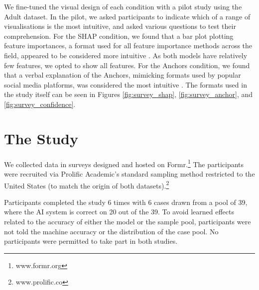 We fine-tuned the visual design of each condition with a pilot study using the Adult dataset. In the pilot, we asked participants to indicate which of a range of visualisations is the most intuitive, and asked various questions to test their comprehension. For the SHAP condition, we found that a bar plot plotting feature importances, a format used for all feature importance methods across the field, appeared to be considered more intuitive \cite{weerts_human-grounded_2019}. As both models have relatively few features, we opted to show all features. For the Anchors condition, we found that a verbal explanation of the Anchors, mimicking formats used by popular social media platforms, was considered the most intuitive \cite{ribeiro_anchors_2018}. The formats used in the study itself can be seen in Figures \ref{fig:survey_shap}, \ref{fig:survey_anchor}, and \ref{fig:survey_confidence}.

\section{The Study}\label{sec:study}
We collected data in surveys designed and hosted on Formr.\footnote{www.formr.org} The participants were recruited via Prolific Academic's standard sampling method restricted to the United States (to match the origin of both datasets).\footnote{www.prolific.co}

Participants completed the study 6 times with 6 cases drawn from a pool of 39, where the AI system is correct on 20 out of the 39. To avoid learned effects related to the accuracy of either the model or the sample pool, participants were not told the machine accuracy or the distribution of the case pool. No participants were permitted to take part in both studies.